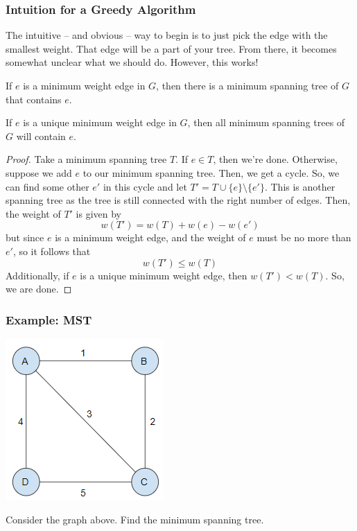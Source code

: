 \documentclass[letterpaper]{article}
\begin{document}
\subsubsection{Intuition for a Greedy Algorithm}
The intuitive -- and obvious -- way to begin is to just pick the edge with the smallest weight. That edge will be a part of your tree. From there, it becomes somewhat unclear what we should do. However, this works! 

\begin{lemma}{}{}
    If $e$ is a minimum weight edge in $G$, then there is a minimum spanning tree of $G$ that contains $e$. 

    \bigskip 

    If $e$ is a unique minimum weight edge in $G$, then all minimum spanning trees of $G$ will contain $e$. 
\end{lemma}

\begin{mdframed}[]
    \begin{proof}
        Take a minimum spanning tree $T$. If $e \in T$, then we're done. Otherwise, suppose we add $e$ to our minimum spanning tree. Then, we get a cycle. So, we can find some other $e'$ in this cycle and let $T' = T \cup \{e\} \setminus \{e'\}$. This is another spanning tree as the tree is still connected with the right number of edges. Then, the weight of $T'$ is given by 
        \[w(T') = w(T) + w(e) - w(e')\]
        but since $e$ is a minimum weight edge, and the weight of $e$ must be no more than $e'$, so it follows that 
        \[w(T') \leq w(T)\] 
        Additionally, if $e$ is a unique minimum weight edge, then $w(T') < w(T)$. So, we are done. 
    \end{proof}
\end{mdframed}

\subsubsection{Example: MST}
\begin{center}
    \includegraphics[scale=0.6]{assets/mst_1.png}
\end{center}
Consider the graph above. Find the minimum spanning tree. 
\end{document}
